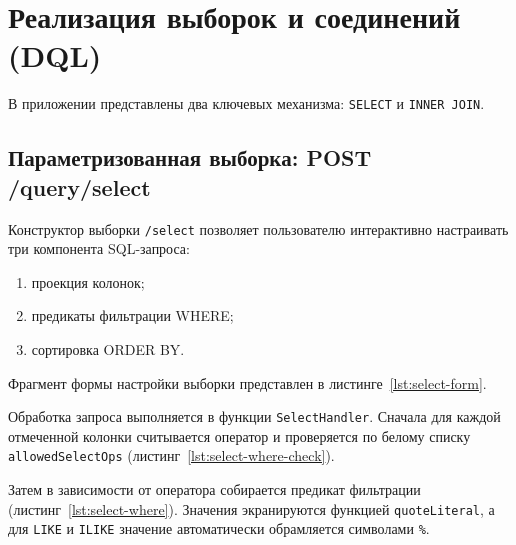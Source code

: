 \section{Реализация выборок и соединений (DQL)}
\label{sec:dql}

В приложении представлены два ключевых механизма: \texttt{SELECT} и \texttt{INNER JOIN}.

\subsection{Параметризованная выборка: POST /query/select}

Конструктор выборки \texttt{/select} позволяет пользователю интерактивно настраивать три компонента SQL-запроса:
\begin{enumerate}
    \item проекция колонок;
    \item предикаты фильтрации WHERE;
    \item сортировка ORDER BY.
\end{enumerate}

Фрагмент формы настройки выборки представлен в листинге~\ref{lst:select-form}.

\begin{listing}[H]
    \caption{Интерактивный конструктор выборки в \texttt{templates/select.html}}
    \label{lst:select-form}
\end{listing}

Обработка запроса выполняется в функции \texttt{SelectHandler}. Сначала для каждой отмеченной колонки считывается оператор и проверяется по белому списку \texttt{allowedSelectOps} (листинг~\ref{lst:select-where-check}).

\begin{listing}[H]
    \caption{Проверка оператора фильтрации в \texttt{handlers\_query.go}}
    \label{lst:select-where-check}
\end{listing}

Затем в зависимости от оператора собирается предикат фильтрации (листинг~\ref{lst:select-where}). Значения экранируются функцией \texttt{quoteLiteral}, а для \texttt{LIKE} и \texttt{ILIKE} значение автоматически обрамляется символами \texttt{\%}.

\begin{listing}[H]
    \caption{Сборка условий фильтрации WHERE в \texttt{handlers\_query.go}}
    \label{lst:select-where}
\end{listing}


